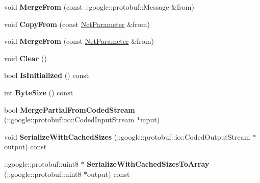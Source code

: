 \begin{DoxyCompactItemize}
void {\bfseries Merge\+From} (const \+::google\+::protobuf\+::\+Message \&from)
\item 
\mbox{\label{classcaffe_1_1_net_parameter_a0ab6e3ad513633ec11de614dd14cba84}} 
void {\bfseries Copy\+From} (const \mbox{\hyperlink{classcaffe_1_1_net_parameter}{Net\+Parameter}} \&from)
\item 
\mbox{\label{classcaffe_1_1_net_parameter_a71d8d073a4338df7bcf1ae5989f67a3c}} 
void {\bfseries Merge\+From} (const \mbox{\hyperlink{classcaffe_1_1_net_parameter}{Net\+Parameter}} \&from)
\item 
\mbox{\label{classcaffe_1_1_net_parameter_a0f07e912faf035aa6fec8b68176bffa6}} 
void {\bfseries Clear} ()
\item 
\mbox{\label{classcaffe_1_1_net_parameter_a032ac97ebba2724ad111dc4a506278d0}} 
bool {\bfseries Is\+Initialized} () const
\item 
\mbox{\label{classcaffe_1_1_net_parameter_ae0a3dd0c4ea482c1b2653c44991cd71e}} 
int {\bfseries Byte\+Size} () const
\item 
\mbox{\label{classcaffe_1_1_net_parameter_a1a55cdefaf13c8896111916cdc77c946}} 
bool {\bfseries Merge\+Partial\+From\+Coded\+Stream} (\+::google\+::protobuf\+::io\+::\+Coded\+Input\+Stream $\ast$input)
\item 
\mbox{\label{classcaffe_1_1_net_parameter_aa73ebb83e591457231ca386213c558f6}} 
void {\bfseries Serialize\+With\+Cached\+Sizes} (\+::google\+::protobuf\+::io\+::\+Coded\+Output\+Stream $\ast$output) const
\item 
\mbox{\label{classcaffe_1_1_net_parameter_acbf1688448e80d9f4789e70af2d84d27}} 
\+::google\+::protobuf\+::uint8 $\ast$ {\bfseries Serialize\+With\+Cached\+Sizes\+To\+Array} (\+::google\+::protobuf\+::uint8 $\ast$output) const
\item 
\mbox{\label{classcaffe_1_1_net_parameter_a26b1079abaea0a84689a5864017fe84c}} 

\end{DoxyCompactItemize}
